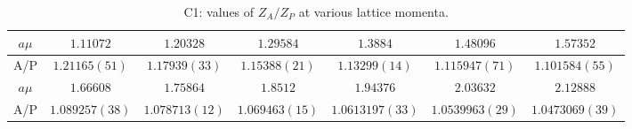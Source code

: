 \begin{table}[h!]
\begin{center}
\caption{C1: values of $Z_A/Z_P$ at various lattice momenta.}
\begin{tabular}{c|c c c c c c}
\hline
\hline
$a\mu$ & $1.11072$ & $1.20328$ & $1.29584$ & $1.3884$ & $1.48096$ & $1.57352$ \\
\hline
A/P & $1.21165(51)$ & $1.17939(33)$ & $1.15388(21)$ & $1.13299(14)$ & $1.115947(71)$ & $1.101584(55)$ \\
\hline
$a\mu$ & $1.66608$ & $1.75864$ & $1.8512$ & $1.94376$ & $2.03632$ & $2.12888$ \\
\hline
A/P & $1.089257(38)$ & $1.078713(12)$ & $1.069463(15)$ & $1.0613197(33)$ & $1.0539963(29)$ & $1.0473069(39)$ \\
\hline
\hline
\end{tabular}
\end{center}
\end{table}